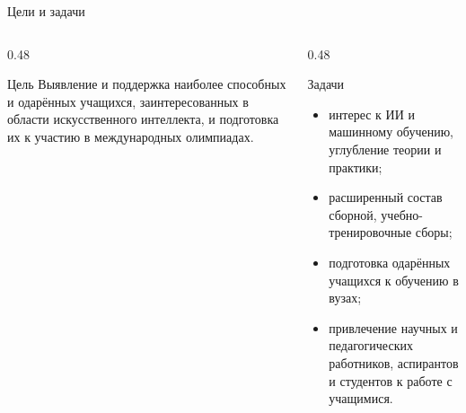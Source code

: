 \begin{frame}{Цели и задачи}
  \vspace{0.3em}
  \begin{columns}[T]
    \begin{column}{0.48\textwidth}
      \begin{block}{Цель}
        Выявление и поддержка наиболее способных и одарённых учащихся,
        заинтересованных в области искусственного интеллекта,
        и подготовка их к участию в международных олимпиадах.
      \end{block}
    \end{column}
    \begin{column}{0.48\textwidth}
      \begin{block}{Задачи}
        \begin{itemize}
          \item интерес к ИИ и машинному обучению, углубление
                теории и практики;
          \item расширенный состав сборной, учебно-тренировочные сборы;
          \item подготовка одарённых учащихся к обучению в вузах;
          \item привлечение научных и педагогических работников,
                аспирантов и студентов к работе с учащимися.
        \end{itemize}
      \end{block}
    \end{column}
  \end{columns}
\end{frame}
